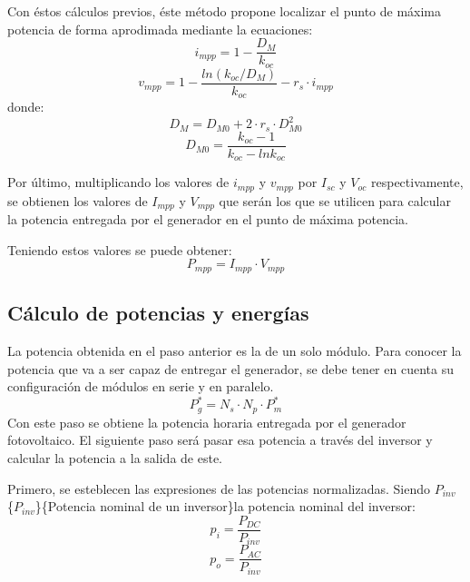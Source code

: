 Con éstos cálculos previos, éste método propone localizar el punto de máxima potencia de forma aprodimada mediante la ecuaciones:
\begin{equation}
i_{mpp}=1-\frac{D_M}{k_{oc}}
\end{equation}
\begin{equation}
v_{mpp}=1-\frac{ln(k_{oc}/D_M)}{k_{oc}}-r_s\cdot i_{mpp}
\end{equation}
donde:
\begin{equation}
D_M=D_{M0}+2\cdot r_s\cdot D_{M0}^2
\end{equation}
\begin{equation}
D_{M0}=\frac{k_{oc}-1}{k_{oc}-lnk_{oc}}
\end{equation}

Por último, multiplicando los valores de \(i_{mpp}\) y \(v_{mpp}\) por \(I_{sc}\) y \(V_{oc}\) respectivamente, se obtienen los valores de \(I_{mpp}\) y \(V_{mpp}\) que serán los que se utilicen para calcular la potencia entregada por el generador en el punto de máxima potencia.

Teniendo estos valores se puede obtener:
\begin{equation}
P_{mpp}=I_{mpp}\cdot V_{mpp}
\end{equation}

\subsection{Cálculo de potencias y energías}
\label{sec:org0f47d48}
\label{subsec:calculo-potencias-energias}
La potencia obtenida en el paso anterior es la de un solo módulo. Para conocer la potencia que va a ser capaz de entregar el generador, se debe tener en cuenta su configuración de módulos en serie y en paralelo.
\begin{equation}
P_g^*=N_s\cdot N_p\cdot P_m^*
\end{equation}
Con este paso se obtiene la potencia horaria entregada por el generador fotovoltaico. El siguiente paso será pasar esa potencia a través del inversor y calcular la potencia a la salida de este.

Primero, se esteblecen las expresiones de las potencias normalizadas. Siendo \(P_{inv}\) \nomenclature[Pinv]\{\(P_{inv}\)\}\{Potencia nominal de un inversor\}la potencia nominal del inversor:
\begin{equation}
p_i=\frac{P_{DC}}{P_{inv}}
\end{equation}
\begin{equation}
p_o=\frac{P_{AC}}{P_{inv}}
\end{equation}


